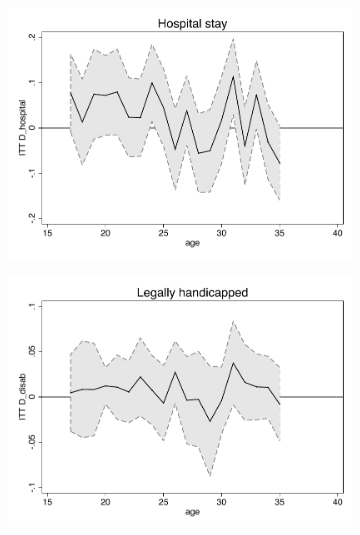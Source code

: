 \documentclass[a4paper ]{article}
\begin{document}
\begin{figure}[p]
\begin{subfigure}[h]{0.48\textwidth}\centering
	\includegraphics[width=\textwidth]{../../analysis/graphs/SOEP/D_hospital_LC.pdf}
\end{subfigure}
\quad
\begin{subfigure}[h]{0.48\textwidth}\centering
	\includegraphics[width=\textwidth]{../../analysis/graphs/SOEP/D_disab_LC.pdf}
\end{subfigure}


\end{figure}
\end{document}
